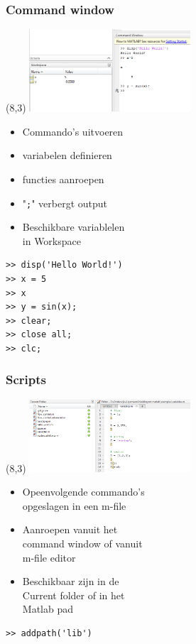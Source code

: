 \documentclass[t]{beamer}
\begin{document}
\begin{frame}[fragile]
	\frametitle{Command window}
    \begin{textblock}{6}(8,3)
        \includegraphics[width=6cm]{fig/commandwindow}
    \end{textblock}
    	
    \begin{itemize}
		\item Commando's uitvoeren
		\item variabelen definieren
		\item functies aanroepen
		\item "\lstinline{;}" verbergt output
		\item Beschikbare variablelen\\ in Workspace
	\end{itemize}
	
    \vspace{0.5cm}
    
	\begin{lstlisting}
>> disp('Hello World!')
>> x = 5
>> x
>> y = sin(x);
>> clear;
>> close all;
>> clc;
	\end{lstlisting}
\end{frame}
\begin{frame}[fragile]
	\frametitle{Scripts}
	\begin{textblock}{6}(8,3)
        \includegraphics[width=6cm]{fig/available}
    \end{textblock}
    
	\begin{itemize}
		\item Opeenvolgende commando's\\ opgeslagen in een m-file
		\item Aanroepen vanuit het \\command window of vanuit \\m-file editor
		\item Beschikbaar zijn in de \\Current folder of in het \\Matlab pad
	\end{itemize}
	
	\vspace{1cm}
	
	\begin{lstlisting}
>> addpath('lib')
	\end{lstlisting}
\end{frame}
\end{document}
